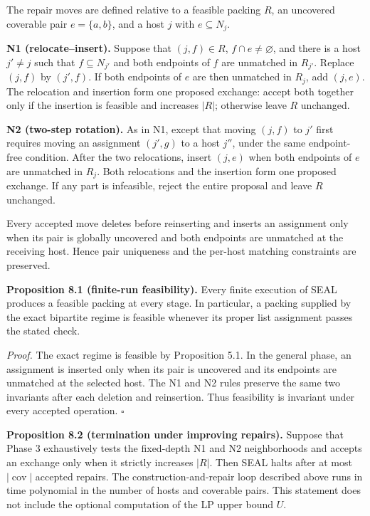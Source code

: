 \documentclass[english,11pt,a4paper]{article}
\begin{document}
The repair moves are defined relative to a feasible packing \(R\), an
uncovered coverable pair \(e=\{a,b\}\), and a host \(j\) with
\(e\subseteq N_j\).

\textbf{N1 (relocate--insert).} Suppose that \((j,f)\in R\),
\(f\cap e\ne\varnothing\), and there is a host \(j'\ne j\) such that
\(f\subseteq N_{j'}\) and both endpoints of \(f\) are unmatched in
\(R_{j'}\). Replace \((j,f)\) by \((j',f)\). If both endpoints of \(e\)
are then unmatched in \(R_j\), add \((j,e)\). The relocation and
insertion form one proposed exchange: accept both together only if the
insertion is feasible and increases \(|R|\); otherwise leave \(R\)
unchanged.

\textbf{N2 (two-step rotation).} As in N1, except that moving \((j,f)\)
to \(j'\) first requires moving an assignment \((j',g)\) to a host
\(j''\), under the same endpoint-free condition. After the two
relocations, insert \((j,e)\) when both endpoints of \(e\) are unmatched
in \(R_j\). Both relocations and the insertion form one proposed
exchange. If any part is infeasible, reject the entire proposal and
leave \(R\) unchanged.

Every accepted move deletes before reinserting and inserts an assignment
only when its pair is globally uncovered and both endpoints are
unmatched at the receiving host. Hence pair uniqueness and the per-host
matching constraints are preserved.

\textbf{Proposition 8.1 (finite-run feasibility).} Every finite
execution of SEAL produces a feasible packing at every stage. In
particular, a packing supplied by the exact bipartite regime is feasible
whenever its proper list assignment passes the stated check.

\emph{Proof.} The exact regime is feasible by Proposition 5.1. In the
general phase, an assignment is inserted only when its pair is uncovered
and its endpoints are unmatched at the selected host. The N1 and N2
rules preserve the same two invariants after each deletion and
reinsertion. Thus feasibility is invariant under every accepted
operation. \(\square\)

\textbf{Proposition 8.2 (termination under improving repairs).} Suppose
that Phase 3 exhaustively tests the fixed-depth N1 and N2 neighborhoods
and accepts an exchange only when it strictly increases \(|R|\). Then
SEAL halts after at most \(\lvert\operatorname{cov}\rvert\) accepted
repairs. The construction-and-repair loop described above runs in time
polynomial in the number of hosts and coverable pairs. This statement
does not include the optional computation of the LP upper bound \(U\).
\end{document}
